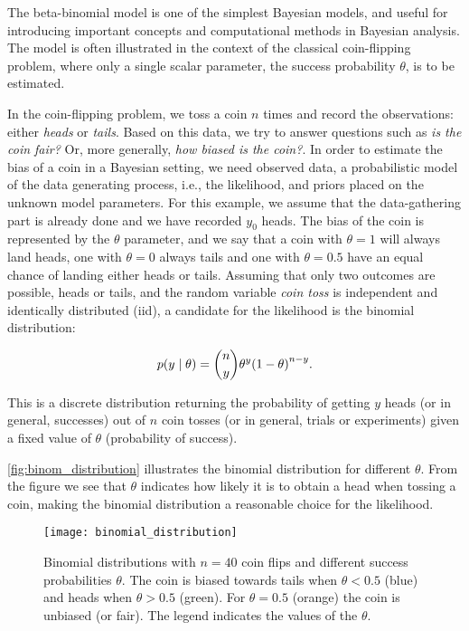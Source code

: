 The beta-binomial model is one of the simplest Bayesian models, and useful for introducing important concepts and computational methods in Bayesian analysis. The model is often illustrated in the context of the classical coin-flipping problem, where only a single scalar parameter, the success probability $\theta$, is to be estimated. 

In the coin-flipping problem, we toss a coin $n$ times and record the observations: either \textit{heads} or \textit{tails}. Based on this data, we try to answer questions such as \textit{is the coin fair?} Or, more generally, \textit{how biased is the coin?}. In order to estimate the bias of a coin in a Bayesian setting, we need observed data, a probabilistic model of the data generating process, i.e., the likelihood, and priors placed on the unknown model parameters. For this example, we assume that the data-gathering part is already done and we have recorded $y_0$ heads. The bias of the coin is represented by the $\theta$ parameter, and we say that a coin with $\theta=1$ will always land heads, one with $\theta=0$ always tails and one with $\theta=0.5$ have an equal chance of landing either heads or tails. Assuming that only two outcomes are possible, heads or tails, and the random variable \textit{coin toss} is independent and identically distributed (iid), a candidate for the likelihood is the binomial distribution: 

\begin{equation}\label{eq:coin_flip_likelihood}
    p \qty(y \mid \theta) = \binom{n}{y} \theta^y \qty(1 - \theta)^{n-y}.
\end{equation}

This is a discrete distribution returning the probability of getting $y$ heads (or in general, successes) out of $n$ coin tosses (or in general, trials or experiments) given a fixed value of $\theta$ (probability of success). 

\autoref{fig:binom_distribution} illustrates the binomial distribution for different $\theta$. From the figure we see that $\theta$ indicates how likely it is to obtain a head when tossing a coin, making the binomial distribution a reasonable choice for the likelihood. 

\begin{figure}[H]
    \centering
    \texttt{[image: binomial\_distribution]}
    \caption{Binomial distributions with $n=40$ coin flips and different success probabilities $\theta$. The coin is biased towards tails when $\theta < 0.5$ (blue) and heads when $\theta > 0.5$ (green). For $\theta=0.5$ (orange) the coin is unbiased (or fair). The legend indicates the values of the $\theta$.}
    \label{fig:binom_distribution}
\end{figure} 

